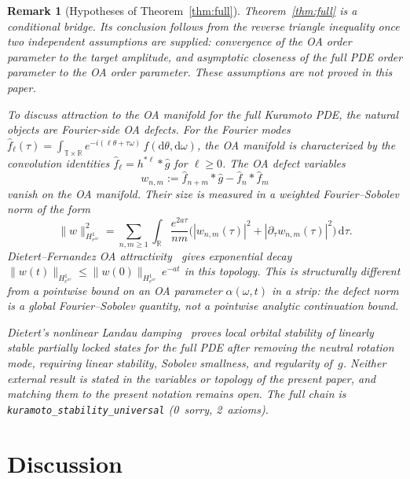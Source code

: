 \documentclass[11pt,a4paper]{article}
\newtheorem{remark}[theorem]{Remark}
\theoremstyle{definition}
\newcommand{\R}{\mathbb{R}}
\begin{document}
\begin{remark}[Hypotheses of Theorem~\ref{thm:full}]\label{rem:bridge-hypotheses}
Theorem~\ref{thm:full} is a conditional bridge. Its conclusion follows from the reverse triangle inequality once two independent assumptions are supplied: convergence of the OA order parameter to the target amplitude, and asymptotic closeness of the full PDE order parameter to the OA order parameter. These assumptions are not proved in this paper.

To discuss attraction to the OA manifold for the full Kuramoto PDE, the natural objects are Fourier-side OA defects. For the Fourier modes $\hat f_\ell(\tau) = \int_{\mathbb{T} \times \mathbb{R}} e^{-i(\ell\theta + \tau\omega)}\,f(\mathrm{d}\theta,\mathrm{d}\omega)$, the OA manifold is characterized by the convolution identities $\hat f_\ell = h^{*\ell} * \hat g$ for $\ell \geq 0$. The OA defect variables
\[
w_{n,m} := \hat f_{n+m} * \hat g - \hat f_n * \hat f_m
\]
vanish on the OA manifold. Their size is measured in a weighted Fourier--Sobolev norm of the form
\[
\|w\|_{H^1_{e^{a\tau}}}^2 = \sum_{n,m \geq 1} \int_\R \frac{e^{2a\tau}}{nm}\bigl(|w_{n,m}(\tau)|^2 + |\partial_\tau w_{n,m}(\tau)|^2\bigr)\,\mathrm{d}\tau.
\]
Dietert--Fernandez OA attractivity~\cite{dietert-fernandez2018} gives exponential decay $\|w(t)\|_{H^1_{e^{a\tau}}} \leq \|w(0)\|_{H^1_{e^{a\tau}}}\,e^{-at}$ in this topology. This is structurally different from a pointwise bound on an OA parameter $\alpha(\omega,t)$ in a strip: the defect norm is a global Fourier--Sobolev quantity, not a pointwise analytic continuation bound.

Dietert's nonlinear Landau damping~\cite{dietert2017} proves local orbital stability of linearly stable partially locked states for the full PDE after removing the neutral rotation mode, requiring linear stability, Sobolev smallness, and regularity of~$g$. Neither external result is stated in the variables or topology of the present paper, and matching them to the present notation remains open. The full chain is \texttt{kuramoto\_stability\_universal} (0~sorry, 2~axioms).
\end{remark}

\section{Discussion}\label{sec:discussion}
\end{document}
